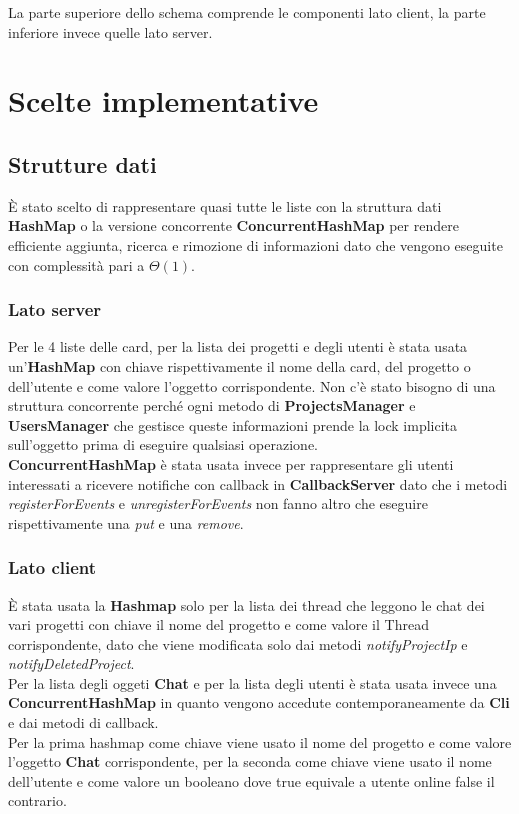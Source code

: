 \documentclass[11pt]{report}
\begin{document}
	
	La parte superiore dello schema comprende le componenti lato client, la parte inferiore invece quelle lato server.
	
	
	\chapter{Scelte implementative}
	\section{Strutture dati}
	È stato scelto di rappresentare quasi tutte le liste con la struttura dati \textbf{HashMap} o la versione concorrente \textbf{ConcurrentHashMap} per rendere efficiente aggiunta, ricerca e rimozione di informazioni dato che vengono eseguite con complessità pari a $\Theta(1)$.\\
	
	\subsection{Lato server}
	Per le 4 liste delle card, per la lista dei progetti e degli utenti è stata usata un'\textbf{HashMap} con chiave rispettivamente il nome della card, del progetto o dell'utente e come valore l'oggetto corrispondente. Non c'è stato bisogno di una struttura concorrente perché ogni metodo di \textbf{ProjectsManager} e \textbf{UsersManager} che gestisce queste informazioni prende la lock implicita sull'oggetto prima di eseguire qualsiasi operazione.\\
	\textbf{ConcurrentHashMap} è stata usata invece per rappresentare gli utenti interessati a ricevere notifiche con callback in \textbf{CallbackServer} dato che i metodi \textit{registerForEvents} e \textit{unregisterForEvents} non fanno altro che eseguire rispettivamente una \textit{put} e una \textit{remove}.
	
	\subsection{Lato client}
	È stata usata la \textbf{Hashmap} solo per la lista dei thread che leggono le chat dei vari progetti con chiave il nome del progetto e come valore il Thread corrispondente, dato che viene modificata solo dai metodi \textit{notifyProjectIp} e \textit{notifyDeletedProject}. \\
	Per la lista degli oggeti \textbf{Chat} e per la lista degli utenti è stata usata invece una \textbf{ConcurrentHashMap} in quanto vengono accedute contemporaneamente da \textbf{Cli} e dai metodi di callback.\\
	Per la prima hashmap come chiave viene usato il nome del progetto e come valore l'oggetto \textbf{Chat} corrispondente, per la seconda come chiave viene usato il nome dell'utente e come valore un booleano dove true equivale a utente online false il contrario.
	
\end{document}
